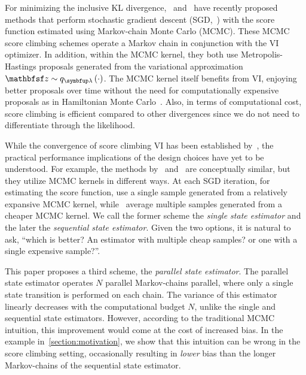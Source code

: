 For minimizing the inclusive KL divergence,~\citet{NEURIPS2020_b2070693} and~\citet{pmlr-v124-ou20a} have recently proposed  methods that perform stochastic gradient descent (SGD,~\citealt{robbins_stochastic_1951}) with the score function estimated using Markov-chain Monte Carlo (MCMC).
These MCMC score climbing schemes operate a Markov chain in conjunction with the VI optimizer.
In addition, within the MCMC kernel, they both use Metropolis-Hastings proposals generated from the variational approximation \(\rvvz \sim q_{\vlambda}\left(\cdot\right)\).
The MCMC kernel itself benefits from VI, enjoying better proposals over time without the need for computationally expensive proposals as in Hamiltonian Monte Carlo~\citep{duane_hybrid_1987, neal_mcmc_2011, betancourt_conceptual_2017}.
Also, in terms of computational cost, score climbing is efficient compared to other divergences since we do not need to differentiate through the likelihood.

While the convergence of score climbing VI has been established by~\citet{NEURIPS2020_b2070693, gu_stochastic_1998}, the practical performance implications of the design choices have yet to be understood.
For example, the methods by~\citeauthor{NEURIPS2020_b2070693} and~\citet{pmlr-v124-ou20a} are conceptually similar, but they utilize MCMC kernels in different ways.
At each SGD iteration, for estimating the score function, \citeauthor{NEURIPS2020_b2070693} use a single sample generated from a relatively expansive MCMC kernel, while~\citeauthor{pmlr-v124-ou20a} average multiple samples generated from a cheaper MCMC kernel.
We call the former scheme the \textit{single state estimator} and the later the \textit{sequential state estimator}.
Given the two options, it is natural to ask, ``which is better? An estimator with multiple cheap samples? or one with a single expensive sample?''.

This paper proposes a third scheme, the \textit{parallel state estimator}.
The parallel state estimator operates \(N\) parallel Markov-chains parallel, where only a single state transition is performed on each chain.
The variance of this estimator linearly decreases with the computational budget \(N\), unlike the single and sequential state estimators.
However, according to the traditional MCMC intuition, this improvement would come at the cost of increased bias.
In the example in~\cref{section:motivation}, we show that this intuition can be wrong in the score climbing setting, occasionally resulting in \textit{lower} bias than the longer Markov-chains of the sequential state estimator.

